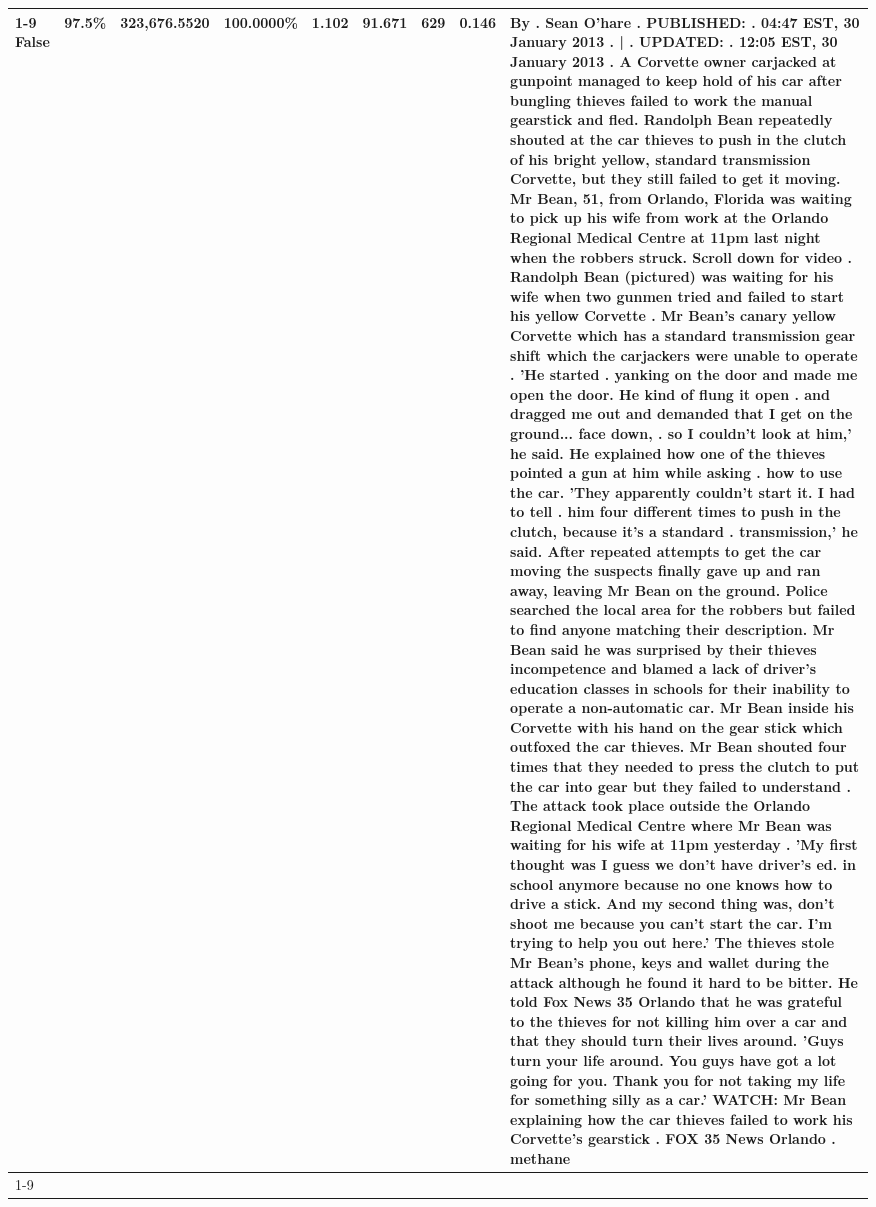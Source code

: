 \begin{table}[H]
\begin{tabular}{lllrlllll}
\cline{1-9} \cline{2-9}
False & 97.5\% & 323,676.5520 & \bfseries \color{red} 100.0000\% & 1.102 & 91.671 & 629 & 0.146 & By . Sean O'hare . PUBLISHED: . 04:47 EST, 30 January 2013 . | . UPDATED: . 12:05 EST, 30 January 2013 . A Corvette owner carjacked at gunpoint managed to keep hold of his car after bungling thieves failed to work the manual gearstick and fled. Randolph Bean repeatedly shouted at the car thieves to push in the clutch of his bright yellow, standard transmission Corvette, but they still failed to get it moving. Mr Bean, 51, from Orlando, Florida was waiting to pick up his wife from work at the Orlando Regional Medical Centre at 11pm last night when the robbers struck. Scroll down for video . Randolph Bean (pictured) was waiting for his wife when two gunmen tried and failed to start his yellow Corvette . Mr Bean's canary yellow Corvette which has a standard transmission gear shift which the carjackers were unable to operate . 'He started . yanking on the door and made me open the door. He kind of flung it open . and dragged me out and demanded that I get on the ground... face down, . so I couldn't look at him,' he said. He explained how one of the thieves pointed a gun at him while asking . how to use the car. 'They apparently couldn't start it. I had to tell . him four different times to push in the clutch, because it's a standard . transmission,' he said. After repeated attempts to get the car moving the suspects finally gave up and ran away, leaving Mr Bean on the ground. Police searched the local area for the robbers but failed to find anyone matching their description. Mr Bean said he was surprised by their thieves incompetence and blamed a lack of driver's education classes in schools for their inability to operate a non-automatic car. Mr Bean inside his Corvette with his hand on the gear stick which outfoxed the car thieves. Mr Bean shouted four times that they needed to press the clutch to put the car into gear but they failed to understand . The attack took place outside the Orlando Regional Medical Centre where Mr Bean was waiting for his wife at 11pm yesterday . 'My first thought was I guess we don't have driver's ed. in school anymore because no one knows how to drive a stick. And my second thing was, don't shoot me because you can't start the car. I'm trying to help you out here.' The thieves stole Mr Bean's phone, keys and wallet during the attack although he found it hard to be bitter. He told Fox News 35 Orlando that he was grateful to the thieves for not killing him over a car and that they should turn their lives around. 'Guys turn your life around. You guys have got a lot going for you. Thank you for not taking my life for something silly as a car.' WATCH: Mr Bean explaining how the car thieves failed to work his Corvette's gearstick . FOX 35 News Orlando . methane \\
\cline{1-9} \cline{2-9}
\bottomrule
\end{tabular}
\end{table}
